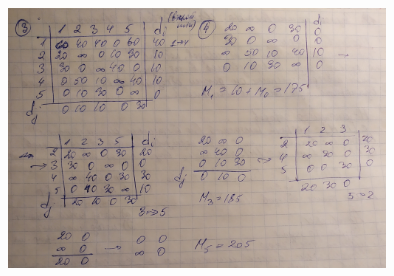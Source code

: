 \documentclass[discrete.tex]{subfiles}
\begin{document}
    \begin{figure}[H]
            \includegraphics[width=10cm]{pics/53_4}
            \centering
    \end{figure}
\end{document}
